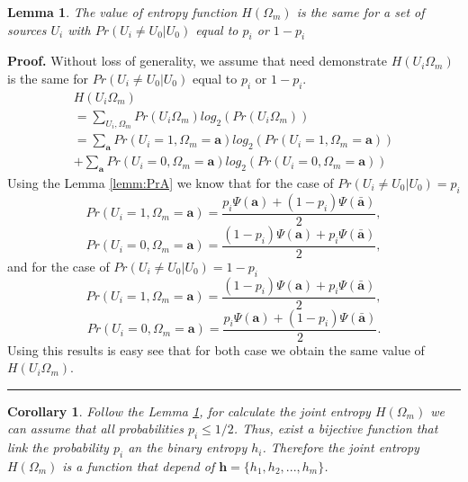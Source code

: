 \documentclass[journal]{IEEEtran}
\newtheorem{lemma}[theorem]{Lemma}
\newenvironment{proof}[1][Proof]{\textbf{#1.} }{\ \rule{0.5em}{0.5em}}
\newtheorem{corollary}[theorem]{Corollary}
\begin{document}
\begin{lemma}
 \label{lemm:hpi} 
The value of entropy function $H(\Omega_m)$ is the same for a set of sources
$U_i$ with $Pr(U_i\neq U_0|U_0)$ equal to $p_i$ or $1-p_i$
\end{lemma}
\begin{proof}
 \label{proof:hpi} 
Without loss of generality, we assume that need demonstrate $H(U_i\Omega_{m})$
is the same for $Pr(U_i\neq U_0|U_0)$ equal to $p_i$ or $1-p_i$.
\begin{equation}\label{eq:hpi1}
\begin{matrix}
H(U_i\Omega_{m})\\
=\sum \limits_{U_i,\Omega_{m}} Pr(U_i\Omega_{m}) log_2(Pr(U_i\Omega_{m})) ~~~~~~~~~~~~~~~~~~~~\\
=\sum \limits_{\mathbf{a}} Pr(U_i=1,\Omega_{m}=\mathbf{a}) log_2(Pr(U_i=1,\Omega_{m}=\mathbf{a}))\\
+\sum \limits_{\mathbf{a}} Pr(U_i=0,\Omega_{m}=\mathbf{a}) log_2(Pr(U_i=0,\Omega_{m}=\mathbf{a}))
\end{matrix}
\end{equation}
Using the Lemma \ref{lemm:PrA} we know that for the case of $Pr(U_i\neq U_0|U_0)=p_i$ 
\begin{equation}\label{eq:hpi2}
Pr(U_i=1,\Omega_m=\mathbf{a})=\frac{ p_i\Psi(\mathbf{a}) + (1-p_i)\Psi(\mathbf{\bar{a}}) }{2},
\end{equation}
\begin{equation}\label{eq:hpi3}
Pr(U_i=0,\Omega_m=\mathbf{a})=\frac{ (1-p_i)\Psi(\mathbf{a}) + p_i\Psi(\mathbf{\bar{a}}) }{2},
\end{equation}
and for the case of $Pr(U_i\neq U_0|U_0)=1-p_i$
\begin{equation}\label{eq:hpi4}
Pr(U_i=1,\Omega_m=\mathbf{a})=\frac{ (1-p_i)\Psi(\mathbf{a}) + p_i\Psi(\mathbf{\bar{a}}) }{2},
\end{equation}
\begin{equation}\label{eq:hpi5}
Pr(U_i=0,\Omega_m=\mathbf{a})=\frac{ p_i\Psi(\mathbf{a}) + (1-p_i)\Psi(\mathbf{\bar{a}}) }{2}.
\end{equation}
Using this results is easy see that for both case  we obtain the same value of 
$H(U_i\Omega_{m})$.
\end{proof}
\begin{corollary}
 \label{coro:hpi} 
Follow the Lemma \ref{lemm:hpi}, for calculate the joint entropy $H(\Omega_m)$ 
we can assume that all probabilities $p_i \leq 1/2$. Thus, exist a bijective 
function that link the probability $p_i$ an the binary entropy $h_i$. Therefore
the joint entropy $H(\Omega_m)$ is a function that depend of $\mathbf{h}=\{h_1, h_2, ..., h_m\}$.
\end{corollary}
\end{document}
